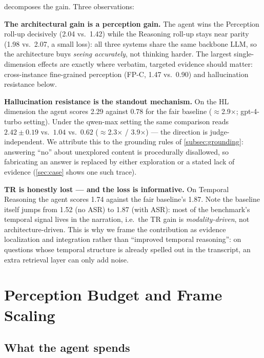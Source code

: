  decomposes the gain. Three observations:

\textbf{The architectural gain is a perception gain.} The agent wins the Perception
roll-up decisively (2.04 vs.\ 1.42) while the Reasoning roll-up stays near parity
(1.98 vs.\ 2.07, a small loss): all three systems share the same backbone LLM, so
the architecture buys \emph{seeing accurately}, not thinking harder. The largest
single-dimension effects are exactly where verbatim, targeted evidence should
matter: cross-instance fine-grained perception (FP-C, 1.47 vs.\ 0.90) and
hallucination resistance below.

\textbf{Hallucination resistance is the standout mechanism.} On the HL dimension
the agent scores 2.29 against 0.78 for the fair baseline
($\approx$2.9$\times$; gpt-4-turbo setting). Under the qwen-max setting the same
comparison reads $2.42 \pm 0.19$ vs.\ $1.04$ vs.\ $0.62$
($\approx$2.3$\times$ / 3.9$\times$) --- the direction is judge-independent. We
attribute this to the grounding rules of \cref{subsec:grounding}: answering ``no''
about unexplored content is procedurally disallowed, so fabricating an answer is
replaced by either exploration or a stated lack of evidence
(\cref{sec:case} shows one such trace).

\textbf{TR is honestly lost --- and the loss is informative.} On Temporal Reasoning
the agent scores 1.74 against the fair baseline's 1.87. Note the baseline itself
jumps from 1.52 (no ASR) to 1.87 (with ASR): most of the benchmark's temporal
signal lives in the narration, i.e.\ the TR gain is \emph{modality-driven}, not
architecture-driven. This is why we frame the contribution as evidence
localization and integration rather than ``improved temporal reasoning'': on
questions whose temporal structure is already spelled out in the transcript, an
extra retrieval layer can only add noise.

\section{Perception Budget and Frame Scaling}
\label{sec:budget}

\subsection{What the agent spends}
\label{subsec:cost}

